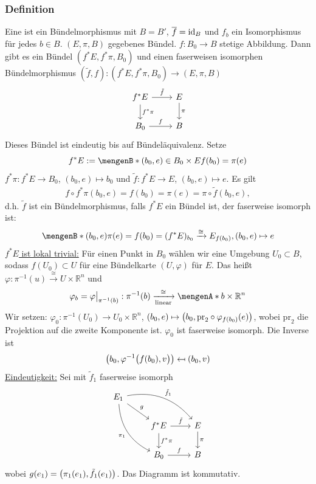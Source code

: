 \subsubsection[Definition: Bündeläquivalenz]{Definition} %
\label{ssub:433}
Eine  ist ein Bündelmorphismus mit $B = B'$, $\overline{f} = \id_B$ und $f_b$ ein Isomorphismus für jedes $b \in B$.
$(E, \pi , B)$ gegebenes Bündel. $f : B_0 \to B$ stetige Abbildung. Dann gibt es ein Bündel $(f^*E, f^*\pi, B_0)$ und einen faserweisen isomorphen Bündelmorphismus
$(\tilde{f},f) : (f^*E, f^*\pi, B_0) \to (E,\pi , B)$
\[
	\begin{tikzcd}
		 f^*E \dar{f^*\pi } \rar{\tilde{f}} & E \dar{\pi} \\
		 B_0 \rar{f}& B
	\end{tikzcd}
\]
Dieses Bündel ist eindeutig bis auf Bündeläquivalenz.
Setze
\[
	f^*E := \set[(b_0,e) \in B_0 \times E]{f(b_0) = \pi(e)} 
\]
$f^* \pi : f^*E \to B_0$, $(b_0,e) \mapsto b_0$ und $\tilde{f} : f^*E \to E$, $(b_0,e) \mapsto e$. Es gilt
\begin{align*}
	f \circ f^* \pi (b_0,e) = f(b_0) = \pi(e) = \pi \circ \tilde{f}(b_0,e),
\end{align*}
d.h. $\tilde{f}$ ist ein Bündelmorphismus, falls $f^*E$ ein Bündel ist, der faserweise isomorph ist: 
\[
	\set[(b_0,e)]{\pi(e)= f(b_0)} = (f^*E)_{b_0} \xrightarrow{\cong} E_{f(b_0)}, (b_0,e) \mapsto e 
\]
\uline{$f^*E$ ist lokal trivial:} Für einen Punkt in $B_0$ wählen wir eine Umgebung $U_0 \subset B$, sodass $f(U_0) \subset U$ für eine Bündelkarte $(U,\varphi)$ für $E$.
Das heißt $\varphi : \pi  ^{-1}(u) \xrightarrow{\cong} U \times \mathds{R}^n $ und
\[
	\varphi_b = \varphi\big|_{\pi ^{-1}(b)} : \pi  ^{-1}(b) \xrightarrow[\text{linear}]{\cong} \set{b} \times \mathds{R}^n 
\]
Wir setzen: $\varphi_0 : \pi  ^{-1} (U_0) \to U_0 \times \mathds{R}^n$, $(b_0,e) \mapsto \enbrace[\big]{b_0, \mathrm{pr}_2 \circ \varphi_{f(b_0)}(e)}$, wobei $\mathrm{pr}_2$ die Projektion auf die zweite Komponente ist. $\varphi_0$ ist faserweise isomorph. Die Inverse ist
\[
	\enbrace*{b_0, \varphi ^{-1} \enbrace[\big]{f(b_0), v} } \mapsfrom (b_0, v)
\]
\uline{Eindeutigkeit:} Sei mit $\tilde{f}_1$ faserweise isomorph
\[
	\begin{tikzcd}
		E_1 \drar{g} \arrow[ddr, swap, "\pi_1", bend right] \arrow[drr, "\tilde{f}_1", bend left]& & \\
		 & f^*E \rar{\tilde{f}} \dar{f^*\pi} & E \dar{\pi } \\
		& B_0 \rar{f} & B
	\end{tikzcd}
\]
wobei $g(e_1) = \enbrace*{\pi_1(e_1), \tilde{f}_1(e_1)} $. Das Diagramm ist kommutativ.

